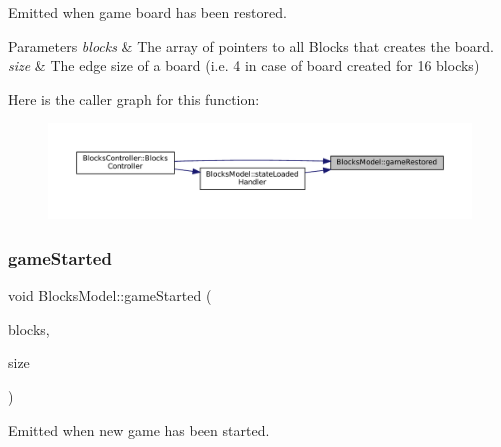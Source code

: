 Emitted when game board has been restored. 


\begin{DoxyParams}{Parameters}
{\em blocks} & The array of pointers to all Blocks that creates the board. \\
\hline
{\em size} & The edge size of a board (i.\+e. 4 in case of board created for 16 blocks) \\
\hline
\end{DoxyParams}
Here is the caller graph for this function\+:
\nopagebreak
\begin{figure}[H]
\begin{center}
\leavevmode
\includegraphics[width=350pt]{class_blocks_model_a1b26e86f148e270ac598aa24accc718b_icgraph}
\end{center}
\end{figure}
\mbox{\label{class_blocks_model_ad4beaf1054214a1688033489a0817a8b}} 
\subsubsection{\texorpdfstring{gameStarted}{gameStarted}}
{\footnotesize\ttfamily void Blocks\+Model\+::game\+Started (\begin{DoxyParamCaption}\item[{const std\+::vector$<$ std\+::shared\+\_\+ptr$<$ \mbox{\hyperlink{class_block}{Block}}$<$ \mbox{\hyperlink{class_block_layout_item}{Block\+Layout\+Item}} $>$$>$$>$ \&}]{blocks,  }\item[{const size\+\_\+t \&}]{size }\end{DoxyParamCaption})\hspace{0.3cm}{\ttfamily [signal]}}



Emitted when new game has been started. 


